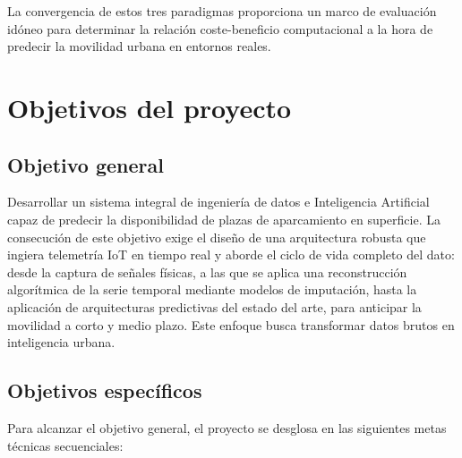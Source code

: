 La convergencia de estos tres paradigmas proporciona un marco de evaluación idóneo para determinar la relación coste-beneficio computacional a la hora de predecir la movilidad urbana en entornos reales.




\section{Objetivos del proyecto}
\label{sec:objetivos}

\subsection{Objetivo general}
\label{subsec:obj_general}

Desarrollar un sistema integral de ingeniería de datos e Inteligencia Artificial capaz de predecir la disponibilidad de plazas de aparcamiento en superficie. La consecución de este objetivo exige el diseño de una arquitectura robusta que ingiera telemetría IoT en tiempo real y aborde el ciclo de vida completo del dato: desde la captura de señales físicas, a las que se aplica una reconstrucción algorítmica de la serie temporal mediante modelos de imputación, hasta la aplicación de arquitecturas predictivas del estado del arte, para anticipar la movilidad a corto y medio plazo. Este enfoque busca transformar datos brutos en inteligencia urbana.

\subsection{Objetivos específicos}
\label{subsec:obj_especificos}

Para alcanzar el objetivo general, el proyecto se desglosa en las siguientes metas técnicas secuenciales:

